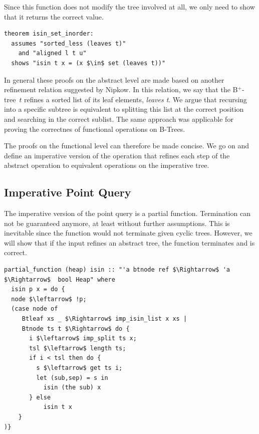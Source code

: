 \documentclass[a4paper,UKenglish,cleveref, autoref, thm-restate]{lipics-v2021}
\newcommand{\btree}{B$^+$-tree}
\begin{document}
Since this function does not modify the tree involved at all,
we only need to show that it returns the correct value.

\begin{lstlisting}[mathescape=true, language=Isabelle,label=lst:isin-set-inorder]
theorem isin_set_inorder:
  assumes "sorted_less (leaves t)"
    and "aligned l t u"
  shows "isin t x = (x $\in$ set (leaves t))"
\end{lstlisting}

In general these proofs on the abstract level are made
based on another refinement relation suggested by Nipkow. \cite{DBLP:conf/itp/Nipkow16}
In this relation, we say that the \btree\ $t$ refines a sorted list of its leaf elements, \emph{leaves t}.
We argue that recursing into a specific subtree
is equivalent to splitting this list at the correct position
and searching in the correct sublist.
The same approach was applicable for proving the correctnes of functional
operations on B-Trees. \cite{DBLP:journals/afp/Mundler21}

The proofs on the functional level can therefore be made concise.
We go on and define an imperative version of the operation that
refines each step of the abstract operation to equivalent operations on the imperative tree.

\subsection{Imperative Point Query}
\label{sec:imperative_pq}

The imperative version of the point query is a partial function.
Termination can not be guaranteed anymore,
at least without further assumptions.
This is inevitable since the function would not terminate
given cyclic trees.
However, we will show that if the input refines an abstract tree,
the function terminates and is correct.

\begin{lstlisting}[mathescape=true, language=Isabelle,label=lst:isin-imp-def]
partial_function (heap) isin :: "'a btnode ref $\Rightarrow$ 'a $\Rightarrow$  bool Heap" where
  isin p x = do {
  node $\leftarrow$ !p;
  (case node of
     Btleaf xs _ $\Rightarrow$ imp_isin_list x xs |
     Btnode ts t $\Rightarrow$ do {
       i $\leftarrow$ imp_split ts x;
       tsl $\leftarrow$ length ts;
       if i < tsl then do {
         s $\leftarrow$ get ts i;
         let (sub,sep) = s in
           isin (the sub) x
       } else
           isin t x
    }
)}
\end{lstlisting}
\end{document}
